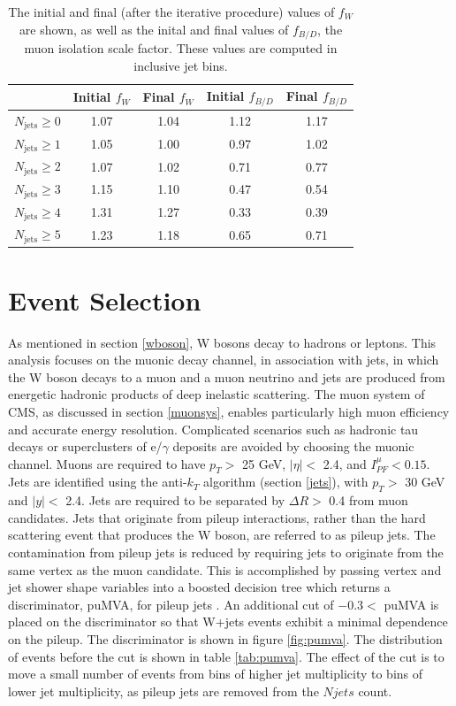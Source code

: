 \documentclass[oneside, letterpaper, oldfontcommands]{memoir}
\begin{document}
\begin{table}
\centering
\caption{The initial and final (after the iterative procedure) values of $f_{W}$ are shown, as well as the inital and final values of $f_{B/D}$, the muon isolation scale factor. These values are computed in inclusive jet bins.}
\footnotesize{
\begin{tabular}{l|cccc}
  &  Initial $f_{W}$ & Final $f_{W}$ & Initial $f_{B/D}$ & Final $f_{B/D}$ \\ \hline
   $N_{\text{jets}} \geq 0$        & 1.07 & 1.04 & 1.12 & 1.17 \\
   $N_{\text{jets}} \geq 1$        & 1.05 & 1.00 & 0.97 & 1.02 \\
   $N_{\text{jets}} \geq 2$        & 1.07 & 1.02 & 0.71 & 0.77 \\
   $N_{\text{jets}} \geq 3$        & 1.15 & 1.10 & 0.47 & 0.54 \\
   $N_{\text{jets}} \geq 4$        & 1.31 & 1.27 & 0.33 & 0.39 \\
   $N_{\text{jets}} \geq 5$        & 1.23 & 1.18 & 0.65 & 0.71 \\
 \hline
 \end{tabular}}
\label{tab:qcdfactorsexc}
\end{table}
 
\section{Event Selection}
\qquad As mentioned in section \ref{wboson}, W bosons decay to hadrons or leptons. This analysis focuses on the muonic decay channel, in association with jets, in which the W boson decays to a muon and a muon neutrino and jets are produced from energetic hadronic products of deep inelastic scattering. The muon system of CMS, as discussed in section \ref{muonsys}, enables particularly high muon efficiency and accurate energy resolution. Complicated scenarios such as hadronic tau decays or superclusters of e/$\gamma$ deposits are avoided by choosing the muonic channel. Muons are required to have $p_{T} >$ 25 GeV, $|\eta| <$ 2.4, and $I_{PF}^{\mu} < 0.15$. Jets are identified using the anti-$k_{T}$ algorithm (section \ref{jets}), with $p_{T} >$ 30 GeV and $|y| <$ 2.4. Jets are required to be separated by $\Delta R >$ 0.4 from muon candidates. Jets that originate from pileup interactions, rather than the hard scattering event that produces the W boson, are referred to as pileup jets. The contamination from pileup jets is reduced by requiring jets to originate from the same vertex as the muon candidate. This is accomplished by passing vertex and jet shower shape variables into a boosted decision tree which returns a discriminator, puMVA, for pileup jets \cite{CMS-PAS-JME-13-005}. An additional cut of $-0.3 <$ puMVA is placed on the discriminator so that W+jets events exhibit a minimal dependence on the pileup. The discriminator is shown in figure \ref{fig:pumva}. The distribution of events before the cut is shown in table \ref{tab:pumva}. The effect of the cut is to move a small number of events from bins of higher jet multiplicity to bins of lower jet multiplicity, as pileup jets are removed from the $Njets$ count. 
\end{document}
